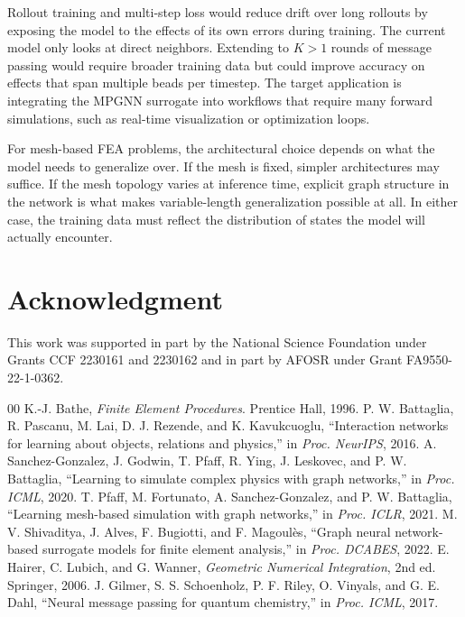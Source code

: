\documentclass[conference]{IEEEtran}
\begin{document}
Rollout training and multi-step loss would reduce drift over long rollouts by exposing the model to the effects of its own errors during training. The current model only looks at direct neighbors. Extending to $K > 1$ rounds of message passing would require broader training data but could improve accuracy on effects that span multiple beads per timestep. The target application is integrating the MPGNN surrogate into workflows that require many forward simulations, such as real-time visualization or optimization loops.

For mesh-based FEA problems, the architectural choice depends on what the model needs to generalize over. If the mesh is fixed, simpler architectures may suffice. If the mesh topology varies at inference time, explicit graph structure in the network is what makes variable-length generalization possible at all. In either case, the training data must reflect the distribution of states the model will actually encounter.

\section*{Acknowledgment}

This work was supported in part by the National Science Foundation under Grants CCF 2230161 and 2230162 and in part by AFOSR under Grant FA9550-22-1-0362.

\begin{thebibliography}{00}
 K.-J. Bathe, \emph{Finite Element Procedures}. Prentice Hall, 1996.
 P. W. Battaglia, R. Pascanu, M. Lai, D. J. Rezende, and K. Kavukcuoglu, ``Interaction networks for learning about objects, relations and physics,'' in \emph{Proc. NeurIPS}, 2016.
 A. Sanchez-Gonzalez, J. Godwin, T. Pfaff, R. Ying, J. Leskovec, and P. W. Battaglia, ``Learning to simulate complex physics with graph networks,'' in \emph{Proc. ICML}, 2020.
 T. Pfaff, M. Fortunato, A. Sanchez-Gonzalez, and P. W. Battaglia, ``Learning mesh-based simulation with graph networks,'' in \emph{Proc. ICLR}, 2021.
 M. V. Shivaditya, J. Alves, F. Bugiotti, and F. Magoul\`{e}s, ``Graph neural network-based surrogate models for finite element analysis,'' in \emph{Proc. DCABES}, 2022.
 E. Hairer, C. Lubich, and G. Wanner, \emph{Geometric Numerical Integration}, 2nd ed. Springer, 2006.
 J. Gilmer, S. S. Schoenholz, P. F. Riley, O. Vinyals, and G. E. Dahl, ``Neural message passing for quantum chemistry,'' in \emph{Proc. ICML}, 2017.
\end{thebibliography}
\end{document}
